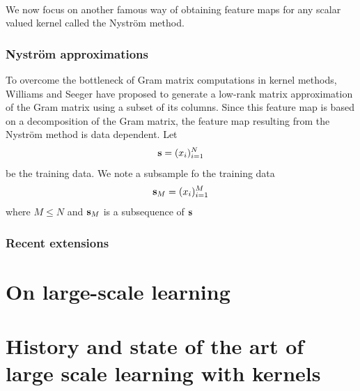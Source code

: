 \paragraph{}
We now focus on another famous way of obtaining feature maps for any scalar
valued kernel called the Nystr\"om method.

\subsubsection{Nystr\"om approximations}
To overcome the bottleneck of Gram matrix computations in kernel methods,
Williams and Seeger \cite{Williams2000-nystrom} have proposed to generate a
low-rank matrix approximation of the Gram matrix using a subset of its columns.
Since this feature map is based on a decomposition of the Gram matrix, the
feature map resulting from the Nystr\"om method is data dependent. Let
\begin{dmath*}
    \seq{s} = (x_i)_{i=1}^N
\end{dmath*}
be the training data. We note a subsample fo the training data
\begin{dmath*}
    \seq{s}_M = (x_i)_{i=1}^M
\end{dmath*}
where $M \le N$ and $\boldsymbol{\mathbf{s}}_M$ is a subsequence of $\boldsymbol{\mathbf{s}}$


\subsubsection{Recent extensions}

\section{On large-scale learning}
\label{sec:on_large-scale_learning}

\section{History and state of the art of large scale learning with kernels}
\label{sec:history}

\chapterend
